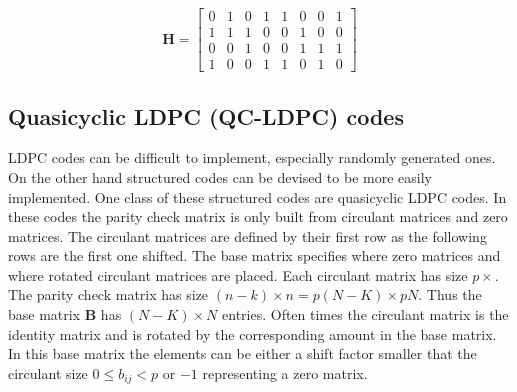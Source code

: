 \begin{equation}
	\bm{H} = \left[\begin{matrix}
		0 & 1 & 0 & 1 & 1 & 0 & 0 & 1 \\ 
		1 & 1 & 1 & 0 & 0 & 1 & 0 & 0 \\
		0 & 0 & 1 & 0 & 0 & 1 & 1 & 1 \\
		1 & 0 & 0 & 1 & 1 & 0 & 1 & 0
	\end{matrix}\right] \label{ldpc_mat}
\end{equation}

\subsection{Quasicyclic LDPC (QC-LDPC) codes}
LDPC codes can be difficult to implement, especially randomly generated ones. On the other hand structured codes can be devised to be more easily implemented. One class of these structured codes are quasicyclic LDPC codes. In these codes the parity check matrix is only built from circulant matrices and zero matrices\cite{Fo04}. The circulant matrices are defined by their first row as the following rows are the first one shifted. The base matrix specifies where zero matrices and where rotated circulant matrices are placed. Each circulant matrix has size $p\times$. The parity check matrix has size $(n-k) \times n = p (N - K) \times p N$. Thus the base matrix $\bm{B}$ has $(N - K) \times N$ entries. Often times the circulant matrix is the identity matrix and is rotated by the corresponding amount in the base matrix. In this base matrix the elements can be either a shift factor smaller that the circulant size $0 \leq b_{ij} < p$ or $-1$ representing a zero matrix.

